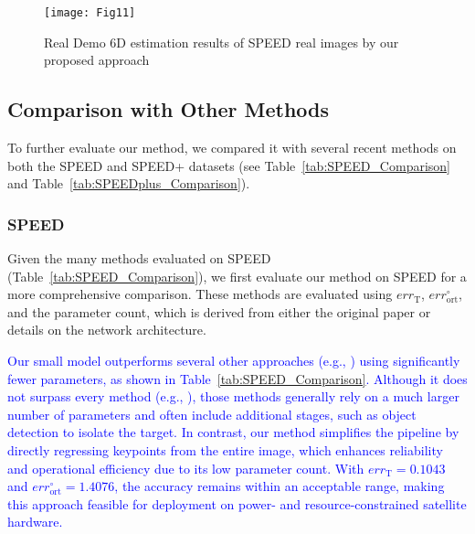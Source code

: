 \documentclass[a4paper,fleqn]{cas-sc}
\begin{document}
\begin{figure*}[htbp]
	\centering
	\texttt{[image: Fig11]} 
	\caption{Real Demo 6D estimation results of SPEED real images by our proposed approach}
	\label{fig:realdemo}
\end{figure*}

\subsection{Comparison with Other Methods}
To further evaluate our method, we compared it with several recent methods on both the SPEED and SPEED+ datasets (see Table~\ref{tab:SPEED_Comparison} and Table~\ref{tab:SPEEDplus_Comparison}).

\subsubsection{SPEED}
Given the many methods evaluated on SPEED (Table~\ref{tab:SPEED_Comparison}), we first evaluate our method on SPEED for a more comprehensive comparison. These methods are evaluated using $err_{\text{T}}$, $err_{\text{ort}}^{\circ}$, and the parameter count, which is derived from either the original paper or details on the network architecture. 

\textcolor{blue}{
Our small model outperforms several other approaches (e.g., \citep{huan2020pose, piazza2021deep}) using significantly fewer parameters, as shown in Table~\ref{tab:SPEED_Comparison}. Although it does not surpass every method (e.g., \citep{chen2019satellite}), those methods generally rely on a much larger number of parameters and often include additional stages, such as object detection to isolate the target. In contrast, our method simplifies the pipeline by directly regressing keypoints from the entire image, which enhances reliability and operational efficiency due to its low parameter count. With $err_{\text{T}} = 0.1043$ and $err_{\text{ort}}^{\circ} = 1.4076$, the accuracy remains within an acceptable range, making this approach feasible for deployment on power- and resource-constrained satellite hardware.
}
\end{document}
